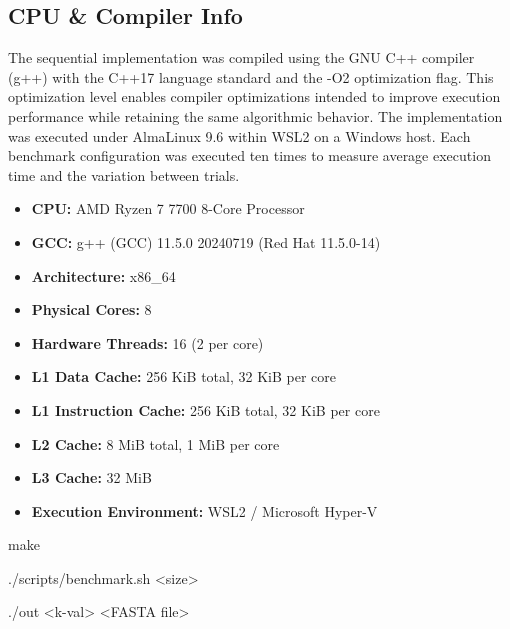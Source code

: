 \documentclass{article}
\begin{document}
\vspace{\baselineskip}

\subsection{CPU \& Compiler Info}

The sequential implementation was compiled using the GNU C++ compiler (g++) with the C++17
language standard and the -O2 optimization flag. This optimization level enables compiler
optimizations intended to improve execution performance while retaining the same algorithmic
behavior. The implementation was executed under AlmaLinux 9.6 within WSL2 on a Windows host.
Each benchmark configuration was executed ten times to measure average execution time and
the variation between trials.

\begin{itemize}
    \item \textbf{CPU:} AMD Ryzen 7 7700 8-Core Processor
    \item \textbf{GCC:} g++ (GCC) 11.5.0 20240719 (Red Hat 11.5.0-14)
    \item \textbf{Architecture:} x86\_64
    \item \textbf{Physical Cores:} 8
    \item \textbf{Hardware Threads:} 16 (2 per core)
    \item \textbf{L1 Data Cache:} 256 KiB total, 32 KiB per core
    \item \textbf{L1 Instruction Cache:} 256 KiB total, 32 KiB per core
    \item \textbf{L2 Cache:} 8 MiB total, 1 MiB per core
    \item \textbf{L3 Cache:} 32 MiB
    \item \textbf{Execution Environment:} WSL2 / Microsoft Hyper-V
\end{itemize}

\FloatBarrier

\vspace{\baselineskip}

\begin{center}
\begin{tcolorbox}[
    colback=gray!8,
    colframe=gray!25,
    arc=3mm,
    boxrule=0.4pt,
    width=0.85\textwidth,
    left=10pt,
    right=10pt,
    top=8pt,
    bottom=8pt
]
\ttfamily
make

\vspace{6pt}

./scripts/benchmark.sh <size>

\vspace{6pt}

./out <k-val> <FASTA file> 

\end{tcolorbox}
\end{center}

\newpage




\end{document}
